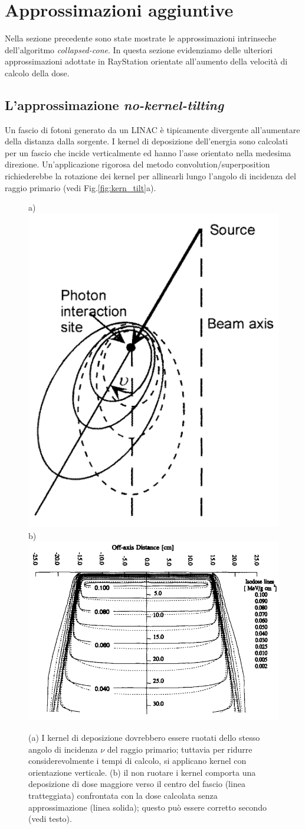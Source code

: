 {\section{Approssimazioni aggiuntive}
Nella sezione precedente sono state mostrate le approssimazioni intrinseche dell'algoritmo \textit{collapsed-cone}. In questa sezione evidenziamo delle ulteriori approssimazioni adottate in RayStation orientate all'aumento della velocità di calcolo della dose.

\subsection{L'approssimazione \textit{no-kernel-tilting}}
Un fascio di fotoni generato da un LINAC è tipicamente divergente all'aumentare della distanza dalla sorgente. I kernel di deposizione dell'energia sono calcolati per un fascio che incide verticalmente ed hanno l'asse orientato nella medesima direzione. Un'applicazione rigorosa del metodo convolution/superposition richiederebbe la rotazione dei kernel per allinearli lungo l'angolo di incidenza del raggio primario (vedi Fig.\ref{fig:kern_tilt}a).\\
\begin{figure}
\centering
a)\includegraphics[width=.3\textwidth]{./cap1/kern_tilt.png}
b)\includegraphics[width=.55\textwidth]{./cap1/kern_tilt_b.png}
\caption{(a) I kernel di deposizione dovrebbero essere ruotati dello stesso angolo di incidenza $\nu$ del raggio primario; tuttavia per ridurre considerevolmente i tempi di calcolo, si applicano kernel con orientazione verticale. (b) il non ruotare i kernel comporta una deposizione di dose maggiore verso il centro del fascio (linea tratteggiata) confrontata con la dose calcolata senza approssimazione (linea solida); questo può essere corretto secondo \cite{Papanikolaou1993} (vedi testo).} 

\end{figure}}
